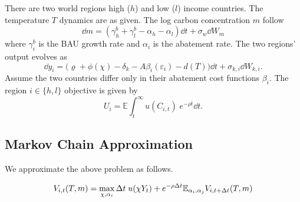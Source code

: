 \documentclass[../../main.tex]{subfiles}
\begin{document}
There are two world regions high ($h$) and low ($l$) income countries. The temperature $T$ dynamics are as given. The log carbon concentration $m$ follow \begin{equation}
    \dd{m} = \left( \gamma^b_h + \gamma^b_l - \alpha_h - \alpha_l \right) \dd{t} + \sigma_w \dd{W}_m
\end{equation} where $\gamma^b_i$ is the BAU growth rate and $\alpha_i$ is the abatement rate. The two regions' output evolves as \begin{equation}
    \dd{y}_i = \Big( \varrho + \phi(\chi) - \delta_k - A \beta_i(\varepsilon_i) - d(T) \Big) \dd{t} + \sigma_{k, i} \dd{W}_{k, i}.
\end{equation} Assume the two countries differ only in their abatement cost functions $\beta_i$. The region $i \in \{h, l\}$ objective is given by \begin{equation}
    U_i = \mathbb{E} \int_{t}^{\infty} u(C_{i, t}) \; e^{-\rho t} \dd{t}.
\end{equation}

\subsection{Markov Chain Approximation}

We approximate the above problem as follows.

\begin{equation}
    V_{i, t}(T, m) = \max_{\chi, \alpha_i} \Delta t \; u(\chi Y_t) + e^{-\rho \Delta t} \mathbb{E}_{\alpha_i, \alpha_j} V_{i, t + \Delta t}(T, m)
\end{equation}
\end{document}
